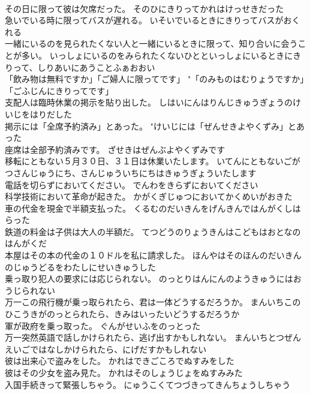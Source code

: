 \documentclass[8pt]{extreport}
\begin{document}
\begin{CJK}{UTF8}{min}
\\	その日に限って彼は欠席だった。	そのひにきりってかれはけっせきだった 
\\	急いでいる時に限ってバスが遅れる。	いそいでいるときにきりってバスがおくれる 
\\	一緒にいるのを見られたくない人と一緒にいるときに限って、知り合いに会うことが多い。	いっしょにいるのをみられたくないひとといっしょにいるときにきりって、しりあいにあうことふぁおおい 
\\	「飲み物は無料ですか」「ご婦人に限ってです」	"「のみものはむりょうですか」「ごふじんにきりってです」 
\\	支配人は臨時休業の掲示を貼り出した。	しはいにんはりんじきゅうぎょうのけいじをはりだした 
\\	掲示には「全席予約済み」とあった。	"けいじには「ぜんせきよやくずみ」とあった 
\\	座席は全部予約済みです。	ざせきはぜんぶよやくずみです 
\\	移転にともない５月３０日、３１日は休業いたします。	いてんにともないごがつさんじゅうにち、さんじゅういちにちはきゅうぎょういたします 
\\	電話を切らずにおいてください。	でんわをきらずにおいてください 
\\	科学技術において革命が起きた。	かがくぎじゅつにおいてかくめいがおきた 
\\	車の代金を現金で半額支払った。	くるむのだいきんをげんきんではんがくしはらった 
\\	鉄道の料金は子供は大人の半額だ。	てつどうのりょうきんはこどもはおとなのはんがくだ 
\\	本屋はその本の代金の１０ドルを私に請求した。	ほんやはそのほんのだいきんのじゅうどるをわたしにせいきゅうした 
\\	乗っ取り犯人の要求には応じられない。	のっとりはんにんのようきゅうにはおうじられない 
\\	万一この飛行機が乗っ取られたら、君は一体どうするだろうか。	まんいちこのひこうきがのっとられたら、きみはいったいどうするだろうか 
\\	軍が政府を乗っ取った。	ぐんがせいふをのっとった 
\\	万一突然英語で話しかけられたら、逃げ出すかもしれない。	まんいちとつぜんえいごではなしかけられたら、にげだすかもしれない 
\\	彼は出来心で盗みをした。	かれはできごころでぬすみをした 
\\	彼はその少女を盗み見た。	かれはそのしょうじょをぬすみみた 
\\	入国手続きって緊張しちゃう。	にゅうこくてつづきってきんちょうしちゃう 

\end{CJK}
\end{document}
